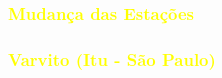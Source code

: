 \documentclass[aspectratio=10]{beamer} %
\begin{document}
{%
	
	\begin{frame}
	\frametitle{\textcolor{yellow}{Mudança das Estações}}
	
\end{frame}
}

{%

\begin{frame}
\frametitle{\textcolor{yellow}{Varvito (Itu - São Paulo)}}

\end{frame}
}

\end{document}
